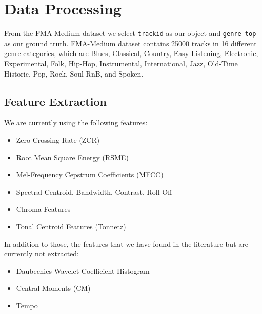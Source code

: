 \section{Data Processing}


From the FMA-Medium dataset we select \texttt{trackid} as our object and \texttt{genre-top} as our ground truth. FMA-Medium dataset contains 25000 tracks in 16 different genre categories, which are Blues, Classical, Country, Easy Listening, Electronic, Experimental, Folk, Hip-Hop, Instrumental, International, Jazz, Old-Time Historic, Pop, Rock, Soul-RnB, and Spoken.

\subsection{Feature Extraction}

We are currently using the following features:

\begin{itemize}
    \item Zero Crossing Rate (ZCR) \cite{Li2006}
    \item Root Mean Square Energy (RSME) \cite{Tao}
    \item Mel-Frequency Cepstrum Coefficients (MFCC) \cite{Li2006, Nanni2016, Hoffmann2016, Lim2012}
    \item Spectral Centroid, Bandwidth, Contrast, Roll-Off \cite{Li2006, Li2005}
    \item Chroma Features
    \item Tonal Centroid Features (Tonnetz) \cite{Harte2006}
\end{itemize}

In addition to those, the features that we have found in the literature but are currently not extracted:

\begin{itemize}
    \item Daubechies Wavelet Coefficient Histogram \cite{Li2006}
    \item Central Moments (CM)
    \item Tempo
\end{itemize}
